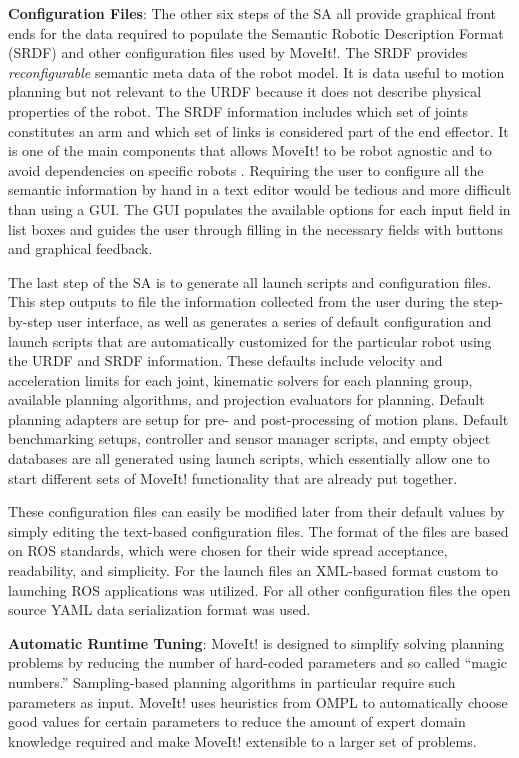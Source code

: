 \documentclass[10pt,journal,compsoc]{joser1}
\begin{document}
{{\bf Configuration Files}: The other six steps of the SA all provide graphical
front ends for the data required to populate the Semantic Robotic Description
Format (SRDF) and other configuration files used by MoveIt!. The SRDF provides
\textit{reconfigurable} semantic meta data of the robot model. It is data useful
to motion planning but not relevant to the URDF because it does not describe
physical properties of the robot. The SRDF information includes which set of
joints constitutes an arm and which set of links is considered part of the end
effector. It is one of the main components that allows MoveIt! to be robot
agnostic and to avoid dependencies on specific robots \cite{moveit}. Requiring
the user to configure all the semantic information by hand in a text editor
would be tedious and more difficult than using a GUI. The GUI populates the
available options for each input field in list boxes and guides the user through
filling in the necessary fields with buttons and graphical feedback.

The last step of the SA is to generate all launch scripts and configuration
files. This step outputs to file the information collected from the user during
the step-by-step user interface, as well as generates a series of default
configuration and launch scripts that are automatically customized for the
particular robot using the URDF and SRDF information. These defaults include
velocity and acceleration limits for each joint, kinematic solvers for each
planning group, available planning algorithms, and projection evaluators for
planning. Default planning adapters are setup for pre- and post-processing of
motion plans. Default benchmarking setups, controller and sensor manager
scripts, and empty object databases are all generated using launch scripts,
which essentially allow one to start different sets of MoveIt! functionality
that are already put together. 

These configuration files can easily be modified later from their default values by simply editing the text-based configuration files. The format of the files are based on ROS standards, which were chosen for their wide spread acceptance, readability, and simplicity. For the launch files an XML-based format custom to launching ROS applications was utilized. For all other configuration files the open source YAML data serialization format was used.

{\bf Automatic Runtime Tuning}: MoveIt! is designed to simplify solving planning
problems by reducing the number of hard-coded parameters and so called ``magic
numbers.'' Sampling-based planning algorithms in particular require such
parameters as input. MoveIt! uses heuristics from OMPL to automatically choose
good values for certain parameters to reduce the amount of expert domain
knowledge required and make MoveIt! extensible to a larger set of problems. 

}
\end{document}

